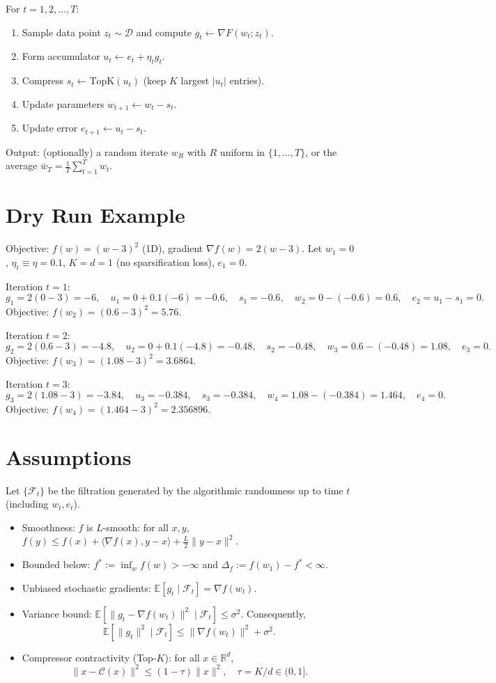 \documentclass[11pt]{article}
\newcommand{\E}{\mathbb{E}}
\newcommand{\R}{\mathbb{R}}
\begin{document}
\noindent
For $t = 1,2,\dots,T$:
\begin{enumerate}
\item Sample data point $z_t \sim \mathcal{D}$ and compute $g_t \gets \nabla F(w_t; z_t)$.
\item Form accumulator $u_t \gets e_t + \eta_t g_t$.
\item Compress $s_t \gets \mathrm{TopK}(u_t)$ (keep $K$ largest $|u_t|$ entries).
\item Update parameters $w_{t+1} \gets w_t - s_t$.
\item Update error $e_{t+1} \gets u_t - s_t$.
\end{enumerate}
Output: (optionally) a random iterate $w_R$ with $R$ uniform in $\{1,\dots,T\}$, or the average $\bar{w}_T = \frac{1}{T}\sum_{t=1}^T w_t$.

\section*{Dry Run Example}
Objective: $f(w) = (w - 3)^2$ (1D), gradient $\nabla f(w) = 2(w-3)$. Let $w_1 = 0$, $\eta_t \equiv \eta = 0.1$, $K=d=1$ (no sparsification loss), $e_1=0$.

Iteration $t=1$:
\[
g_1 = 2(0-3) = -6,\quad u_1 = 0 + 0.1(-6) = -0.6,\quad s_1 = -0.6,\quad
w_2 = 0 - (-0.6) = 0.6,\quad e_2 = u_1 - s_1 = 0.
\]
Objective: $f(w_2) = (0.6-3)^2 = 5.76$.

Iteration $t=2$:
\[
g_2 = 2(0.6-3) = -4.8,\quad u_2 = 0 + 0.1(-4.8) = -0.48,\quad s_2 = -0.48,\quad
w_3 = 0.6 - (-0.48) = 1.08,\quad e_3 = 0.
\]
Objective: $f(w_3) = (1.08-3)^2 = 3.6864$.

Iteration $t=3$:
\[
g_3 = 2(1.08-3) = -3.84,\quad u_3 = -0.384,\quad s_3 = -0.384,\quad
w_4 = 1.08 - (-0.384) = 1.464,\quad e_4 = 0.
\]
Objective: $f(w_4) = (1.464-3)^2 = 2.356896$.

\section*{Assumptions}
Let $\{\mathcal{F}_t\}$ be the filtration generated by the algorithmic randomness up to time $t$ (including $w_t, e_t$).
\begin{itemize}
\item[A1] Smoothness: $f$ is $L$-smooth: for all $x,y$, $f(y) \le f(x) + \langle \nabla f(x), y-x\rangle + \frac{L}{2}\|y-x\|^2$.
\item[A2] Bounded below: $f^* := \inf_w f(w) > -\infty$ and $\Delta_f := f(w_1)-f^* < \infty$.
\item[A3] Unbiased stochastic gradients: $\E[g_t \mid \mathcal{F}_t] = \nabla f(w_t)$.
\item[A4] Variance bound: $\E[\|g_t - \nabla f(w_t)\|^2 \mid \mathcal{F}_t] \le \sigma^2$. Consequently,
\[
\E[\|g_t\|^2 \mid \mathcal{F}_t] \le \|\nabla f(w_t)\|^2 + \sigma^2.
\]
\item[A5] Compressor contractivity (Top-$K$): for all $x \in \R^d$,
\[
\|x - \mathcal{C}(x)\|^2 \le (1-\tau)\|x\|^2,\quad \tau = K/d \in (0,1].
\]
\end{itemize}
\end{document}
